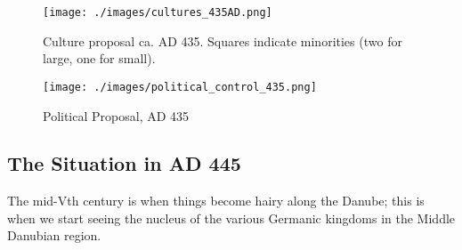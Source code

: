 \documentclass{article}
\begin{document}
	\newpage
	
	\begin{figure}[h!]
		\centering
		\texttt{[image: ./images/cultures\_435AD.png]}
		\caption{Culture proposal ca. AD 435. Squares indicate minorities (two for large, one for small).}
	\end{figure}
	
	\begin{figure}[h!]
		\centering
		\texttt{[image: ./images/political\_control\_435.png]}
		\caption{Political Proposal, AD 435}
	\end{figure}
	
	\newpage
	
	\subsection{The Situation in AD 445}
	\label{sec:timeline:subsec:445}
	The mid-Vth century is when things become hairy along the Danube; this is when we start seeing the nucleus of the various Germanic kingdoms in the Middle Danubian region.
	
\end{document}
